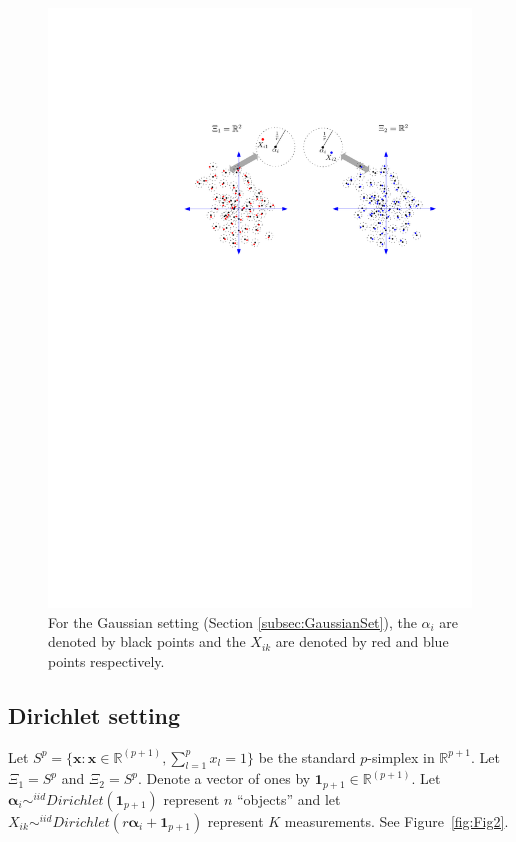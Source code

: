 \documentclass[11pt]{article} %
\begin{document}
    \begin{figure}
	\begin{center}
    \includegraphics[scale=0.75]{MVN_alpha_r_multiple_sancar.pdf}
    \caption{For the  Gaussian setting (Section \ref{subsec:GaussianSet}), the $\alpha_i$ are denoted by black points and the $X_{ik}$ are denoted by red and blue points respectively.}
\label{fig:Fig1}
	\end{center}
  \end{figure}

\subsection{Dirichlet setting\label{subsec:DirichletSet}}
Let $S^p=\{\bm{x}:\bm{x}\in\mathbb{R}^{(p+1)}, \sum_{l=1}^p{x_l}=1\}$ be the standard $p$-simplex in $\mathbb{R}^{p+1}$.
 Let $\Xi_1 = S^p$ and $\Xi_2 = S^p$.   Denote a vector of ones by $\bm{1}_{p+1}\in \mathbb{R}^{(p+1)}$.
  Let $\bm{\alpha}_i \sim^{iid} Dirichlet(\bm{1}_{p+1})$ represent $n$  ``objects'' and let $X_{ik} \sim^{iid} Dirichlet(r\bm{\alpha}_i+\bm{1}_{p+1})$ represent $K$ measurements. See Figure~\ref{fig:Fig2}.
\end{document}
